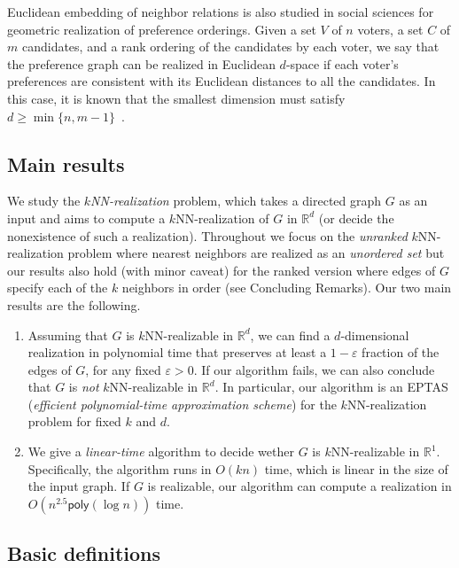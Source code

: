 \documentclass[11pt]{article}
\begin{document}
Euclidean embedding of neighbor relations is also studied in social sciences for geometric realization of preference orderings. Given a set $V$ of $n$ voters, a set $C$ of $m$ candidates, and a rank ordering of the candidates by each voter, we say that the preference graph can be realized in Euclidean $d$-space if each voter's preferences are consistent with its Euclidean distances to all the candidates. In this case, it is known that the smallest dimension must satisfy $d \geq \min \{n , m-1\}$~\cite{bogomolnaia:2007}.

\subsection{Main results}

We study the \textit{$k$NN-realization} problem, which takes a directed graph $G$ as an input and aims to compute a $k$NN-realization of $G$ in $\mathbb{R}^d$ (or decide the nonexistence of such a realization).
Throughout we focus on the \emph{unranked} $k$NN-realization problem where nearest neighbors are realized as an \emph{unordered set} but our results also hold (with minor caveat) for the ranked version where edges of $G$ specify each of the $k$ neighbors in order (see Concluding Remarks). 
Our two main results are the following.

\begin{enumerate}
\item Assuming that $G$ is $k$NN-realizable in $\mathbb{R}^d$, we can find a $d$-dimensional realization in polynomial time that preserves at least a $1 - \varepsilon$ fraction of the edges of $G$, for any fixed $\varepsilon > 0$.
If our algorithm fails, we can also conclude that $G$ is \emph{not} $k$NN-realizable in $\mathbb{R}^d$.
In particular, our algorithm is an EPTAS (\textit{efficient polynomial-time approximation scheme}) for the $k$NN-realization problem for fixed $k$ and $d$.

\smallskip

\item We give a \textit{linear-time} algorithm to decide wether $G$ is $k$NN-realizable in $\mathbb{R}^1$.
Specifically, the algorithm runs in $O(kn)$ time, which is linear in the size of the input graph.
If $G$ is realizable, our algorithm can compute a realization in $O(n^{2.5} \mathsf{poly}(\log n))$ time.
\end{enumerate}

\subsection{Basic definitions}
\end{document}

